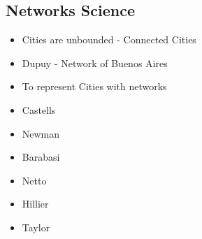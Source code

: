 \subsection{Networks Science}
\begin{itemize}
    \item Cities are unbounded - Connected Cities
    \item Dupuy - Network of Buenos Aires
    \item To represent Cities with networks
    \item Castells
    \item Newman
    \item Barabasi
    \item Netto
    \item Hillier
    \item Taylor
\end{itemize}

